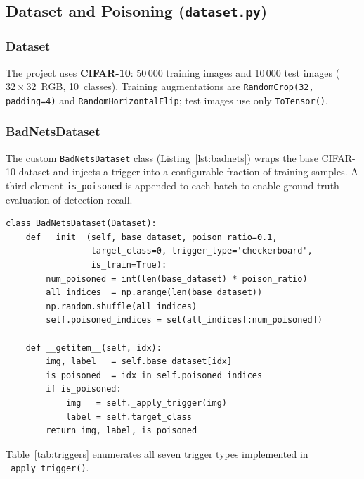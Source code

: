 \documentclass[12pt, letterpaper]{article}
\begin{document}
\subsection{Dataset and Poisoning (\texttt{dataset.py})}
\label{subsec:data}

\subsubsection*{Dataset}

The project uses \textbf{CIFAR-10}: 50\,000 training images and 10\,000 test
images ($32\times32$~RGB, 10~classes).  Training augmentations are
\texttt{Random\-Crop(32, padding=4)} and \texttt{RandomHorizontalFlip};
test images use only \texttt{ToTensor()}.

\subsubsection*{BadNetsDataset}

The custom \texttt{BadNetsDataset} class (Listing~\ref{lst:badnets}) wraps
the base CIFAR-10 dataset and injects a trigger into a configurable fraction
of training samples.  A third element \texttt{is\_poisoned} is appended to
each batch to enable ground-truth evaluation of detection recall.

\begin{singlespace}
\begin{lstlisting}[style=pystyle, caption={Core poisoning logic in
  \texttt{BadNetsDataset} (\texttt{dataset.py}).},
  label=lst:badnets]
class BadNetsDataset(Dataset):
    def __init__(self, base_dataset, poison_ratio=0.1,
                 target_class=0, trigger_type='checkerboard',
                 is_train=True):
        num_poisoned = int(len(base_dataset) * poison_ratio)
        all_indices  = np.arange(len(base_dataset))
        np.random.shuffle(all_indices)
        self.poisoned_indices = set(all_indices[:num_poisoned])

    def __getitem__(self, idx):
        img, label   = self.base_dataset[idx]
        is_poisoned  = idx in self.poisoned_indices
        if is_poisoned:
            img   = self._apply_trigger(img)
            label = self.target_class
        return img, label, is_poisoned
\end{lstlisting}
\end{singlespace}

Table~\ref{tab:triggers} enumerates all seven trigger types implemented in
\texttt{\_apply\_trigger()}.
\end{document}
